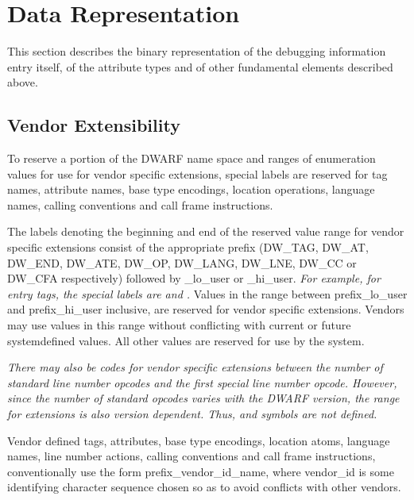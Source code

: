 \chapter{Data Representation}
\label{datarep:datarepresentation}

This section describes the binary representation of the
debugging information entry itself, of the attribute types
and of other fundamental elements described above.


\section{Vendor Extensibility}
\label{datarep:vendorextensibility}

To reserve a portion of the DWARF name space and ranges of
enumeration values for use for vendor specific extensions,
special labels are reserved for tag names, attribute names,
base type encodings, location operations, language names,
calling conventions and call frame instructions.

The labels denoting the beginning and end of the reserved
value range for vendor specific extensions consist of the
appropriate prefix (DW\-\_TAG, DW\-\_AT, DW\-\_END, DW\-\_ATE, DW\-\_OP,
DW\-\_LANG, DW\-\_LNE, DW\-\_CC or DW\-\_CFA respectively) followed by
\_lo\_user or \_hi\_user. 
\textit{For example, for entry tags, the special
labels are  and 
.}
Values in the
range between prefix\_lo\_user and prefix\_hi\_user inclusive,
are reserved for vendor specific extensions. Vendors may
use values in this range without conflicting with current or
future system\dash defined values. All other values are reserved
for use by the system.

\textit{There may also be codes for vendor specific extensions
between the number of standard line number opcodes and
the first special line number opcode. However, since the
number of standard opcodes varies with the DWARF version,
the range for extensions is also version dependent. Thus,
 and 
 symbols are not defined.}

Vendor defined tags, attributes, base type encodings, location
atoms, language names, line number actions, calling conventions
and call frame instructions, conventionally use the form
prefix\_vendor\_id\_name, where vendor\_id is some identifying
character sequence chosen so as to avoid conflicts with
other vendors.

